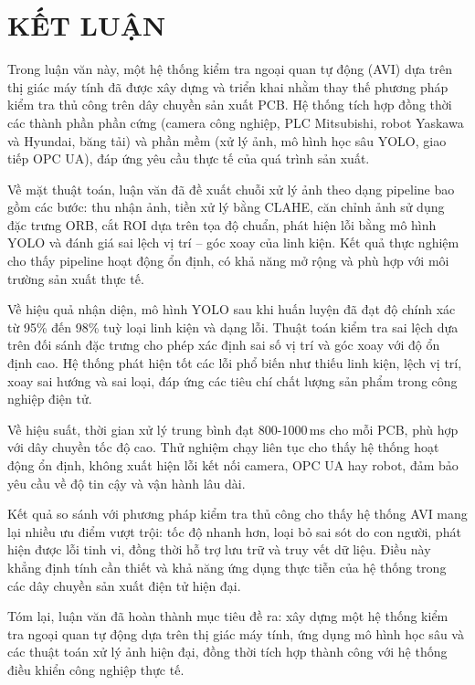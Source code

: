 \chapter*{KẾT LUẬN}

Trong luận văn này, một hệ thống kiểm tra ngoại quan tự động (AVI) dựa trên thị giác máy tính đã được xây dựng và triển khai nhằm thay thế phương pháp kiểm tra thủ công trên dây chuyền sản xuất PCB. Hệ thống tích hợp đồng thời các thành phần phần cứng (camera công nghiệp, PLC Mitsubishi, robot Yaskawa và Hyundai, băng tải) và phần mềm (xử lý ảnh, mô hình học sâu YOLO, giao tiếp OPC UA), đáp ứng yêu cầu thực tế của quá trình sản xuất.

Về mặt thuật toán, luận văn đã đề xuất chuỗi xử lý ảnh theo dạng pipeline bao gồm các bước: thu nhận ảnh, tiền xử lý bằng CLAHE, căn chỉnh ảnh sử dụng đặc trưng ORB, cắt ROI dựa trên tọa độ chuẩn, phát hiện lỗi bằng mô hình YOLO và đánh giá sai lệch vị trí – góc xoay của linh kiện. Kết quả thực nghiệm cho thấy pipeline hoạt động ổn định, có khả năng mở rộng và phù hợp với môi trường sản xuất thực tế.

Về hiệu quả nhận diện, mô hình YOLO sau khi huấn luyện đã đạt độ chính xác từ 95\% đến 98\% tuỳ loại linh kiện và dạng lỗi. Thuật toán kiểm tra sai lệch dựa trên đối sánh đặc trưng cho phép xác định sai số vị trí và góc xoay với độ ổn định cao. Hệ thống phát hiện tốt các lỗi phổ biến như thiếu linh kiện, lệch vị trí, xoay sai hướng và sai loại, đáp ứng các tiêu chí chất lượng sản phẩm trong công nghiệp điện tử.

Về hiệu suất, thời gian xử lý trung bình đạt 800-1000\,ms cho mỗi PCB, phù hợp với dây chuyền tốc độ cao. Thử nghiệm chạy liên tục cho thấy hệ thống hoạt động ổn định, không xuất hiện lỗi kết nối camera, OPC UA hay robot, đảm bảo yêu cầu về độ tin cậy và vận hành lâu dài.

Kết quả so sánh với phương pháp kiểm tra thủ công cho thấy hệ thống AVI mang lại nhiều ưu điểm vượt trội: tốc độ nhanh hơn, loại bỏ sai sót do con người, phát hiện được lỗi tinh vi, đồng thời hỗ trợ lưu trữ và truy vết dữ liệu. Điều này khẳng định tính cần thiết và khả năng ứng dụng thực tiễn của hệ thống trong các dây chuyền sản xuất điện tử hiện đại.

Tóm lại, luận văn đã hoàn thành mục tiêu đề ra: xây dựng một hệ thống kiểm tra ngoại quan tự động dựa trên thị giác máy tính, ứng dụng mô hình học sâu và các thuật toán xử lý ảnh hiện đại, đồng thời tích hợp thành công với hệ thống điều khiển công nghiệp thực tế.

